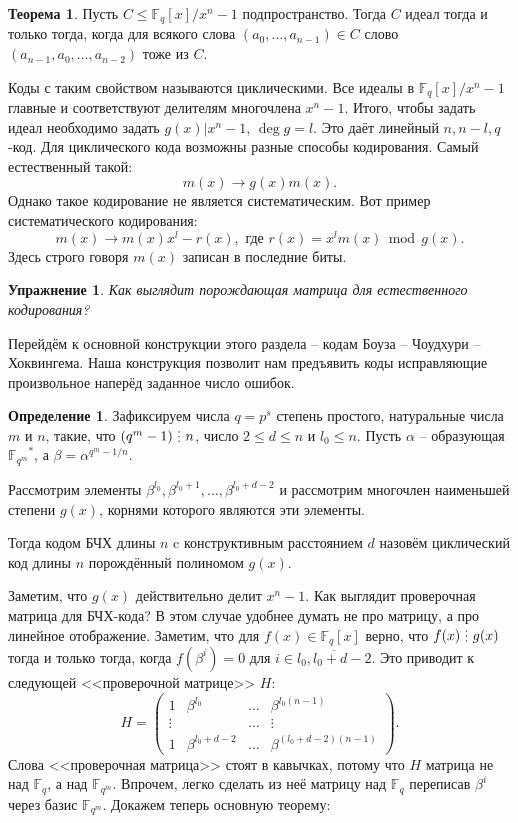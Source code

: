 \documentclass[10pt,a4paper,oneside]{book}
\newtheorem{upr}{Упражнение}
\theoremstyle{definition}
\newtheorem*{defn}{{\color{yellow!30!red} Определение}}
\newtheorem{thm}{{\color{red!40!black} Теорема}}
\renewcommand{\mod}{\,\operatorname{mod}\,}
\newcommand{\mb}[1]{\mathbb{#1}}
\newcommand{\ovl}{\overline}
\newcommand{\di}{\mathop{\,\scalebox{0.85}{\raisebox{-1.2pt}[0.5\height]{\vdots}}\,}}
\def\thrm{\begin{thm}}
\def\ethrm{\end{thm}}
\def\dfn{\begin{defn}}
\def\edfn{\end{defn}}
\def\pmat{\begin{pmatrix}}
\def\epmat{\end{pmatrix}}
\def\bupr{\begin{upr}}
\def\eupr{\end{upr}}
\begin{document}
\thrm Пусть $C\leq \mb F_q[x]/x^n-1$ подпространство. Тогда $C$ идеал тогда и только тогда, когда для всякого слова $(a_0,\dots,a_{n-1})\in C$ слово $(a_{n-1},a_0,\dots,a_{n-2})$ тоже из $C$.
\ethrm

Коды с таким свойством называются циклическими. Все идеалы в $\mb F_q[x]/x^n-1$ главные и соответствуют делителям многочлена $x^n-1$. Итого, чтобы задать идеал необходимо задать $g(x) | x^n-1$, $\deg g=l$. Это даёт линейный $n, n-l, q$-код. Для циклического кода возможны разные способы кодирования. Самый естественный такой:
$$m(x) \to g(x)m(x).$$
Однако такое кодирование не является систематическим. Вот пример систематического кодирования:
$$m(x) \to m(x)x^{l}-r(x), \text{ где } r(x)=x^{l}m(x) \mod g(x).$$
Здесь строго говоря $m(x)$ записан в последние биты.

\bupr Как выглядит порождающая матрица для естественного кодирования?
\eupr



Перейдём к основной конструкции этого раздела -- кодам Боуза -- Чоудхури -- Хоквингема. Наша конструкция позволит нам предъявить коды исправляющие произвольное наперёд заданное число ошибок. 

\dfn Зафиксируем числа $q=p^s$ степень простого, натуральные числа $m$  и $n$, такие, что $(q^m-1)\di n$, число $2\leq d\leq n$ и $l_0 \leq n$. Пусть $\alpha$ -- образующая ${\mb F_{q^m}}^*$, а $\beta=\alpha^{q^m-1/n}$. 

Рассмотрим элементы $\beta^{l_0},\beta^{l_0+1},\dots, \beta^{l_0+d-2}$ и рассмотрим многочлен наименьшей степени $g(x)$, корнями которого являются эти элементы.

Тогда кодом БЧХ длины $n$ c конструктивным расстоянием $d$ назовём циклический код длины $n$ порождённый полиномом $g(x)$.
\edfn

Заметим, что $g(x)$ действительно делит $x^n-1$. Как выглядит проверочная матрица для БЧХ-кода? В этом случае удобнее думать не про матрицу, а про линейное отображение. Заметим, что для $f(x)\in \mb F_q[x]$ верно, что $f(x) \di g(x)$ тогда и только тогда, когда $f(\beta^i)=0$ для $i \in \ovl{l_0,l_0+d-2}$. Это приводит к следующей <<проверочной матрице>> $H$:
$$H=\pmat 1& \beta^{l_0}& \dots& \beta^{l_0(n-1)}\\
\vdots &&\dots&\vdots\\
1& \beta^{l_0+d-2}& \dots & \beta^{(l_0+d-2)(n-1)}
\epmat.$$
Слова <<проверочная матрица>> стоят в кавычках, потому что $H$ матрица не над $\mb F_q$, а над $\mb F_{q^m}$. Впрочем, легко сделать из неё матрицу над $\mb F_q$ переписав $\beta^i$ через базис $\mb F_{q^m}$. Докажем теперь основную теорему:
\end{document}
